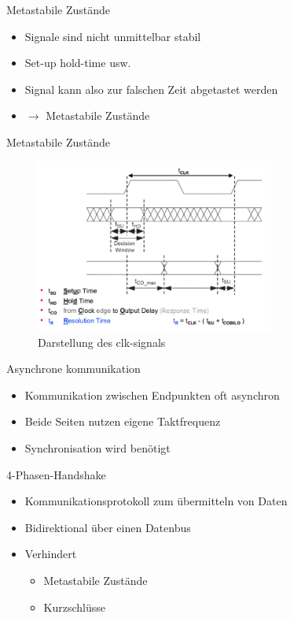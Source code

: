 \documentclass[aspectratio=169,presentation]{beamer}
\begin{document}
\begin{frame} {Metastabile Zustände}
  \begin{itemize}
    \item Signale sind nicht unmittelbar stabil
    \item Set-up hold-time usw.
    \item Signal kann also zur \glqq{}falschen\grqq{} Zeit abgetastet werden
    \item $\rightarrow$ Metastabile Zustände
  \end{itemize}
\end{frame}


\begin{frame} {Metastabile Zustände}
  \begin{figure}[ht]
    \centering
    \includegraphics[width=0.7\textwidth]{figs/signalverlauf.png}
    \caption{Darstellung des clk-signals}
  \end{figure}
\end{frame}


\begin{frame} {Asynchrone kommunikation}
  \begin{itemize}
    \item Kommunikation zwischen Endpunkten oft asynchron
    \item Beide Seiten nutzen eigene Taktfrequenz
    \item Synchronisation wird benötigt
  \end{itemize}
\end{frame}


\begin{frame} {4-Phasen-Handshake}
  \begin{itemize}
    \item Kommunikationsprotokoll zum übermitteln von Daten
    \item Bidirektional über einen Datenbus
    \item Verhindert 
    \begin{itemize}
      \item Metastabile Zustände
      \item Kurzschlüsse
    \end{itemize}
  \end{itemize}
\end{frame}
\end{document}
